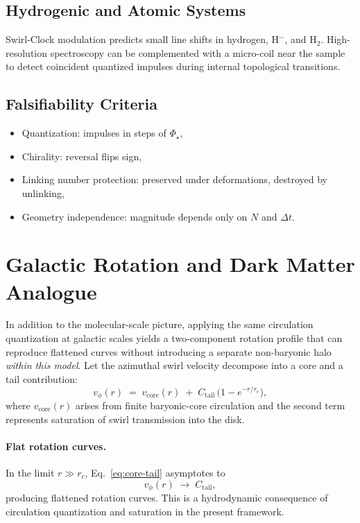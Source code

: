 \documentclass[11pt]{article}
\newcommand{\rc}{r_c}                                    %
\providecommand{\rc}{r_c}
\begin{document}
    \subsection{Hydrogenic and Atomic Systems}
    Swirl-Clock modulation predicts small line shifts in hydrogen, H$^-$, and H$_2$. High-resolution spectroscopy
    can be complemented with a micro-coil near the sample to detect coincident quantized impulses during
    internal topological transitions.

    \subsection{Falsifiability Criteria}
    \begin{itemize}
        \item Quantization: impulses in steps of $\Phi_\star$,
        \item Chirality: reversal flips sign,
        \item Linking number protection: preserved under deformations, destroyed by unlinking,
        \item Geometry independence: magnitude depends only on $N$ and $\Delta t$.
    \end{itemize}

\section{Galactic Rotation and Dark Matter Analogue}
\label{sec:galactic-dm}

    In addition to the molecular-scale picture, applying the same circulation quantization at galactic scales yields a two-component rotation profile that can reproduce flattened curves without introducing a separate non-baryonic halo \emph{within this model}.
    Let the azimuthal swirl velocity decompose into a core and a tail contribution:
    \begin{equation}
        v_\phi(r) \;=\; v_\text{core}(r) \;+\;
        C_\text{tail}\,\Big(1-e^{-r/\rc}\Big),
        \label{eq:core-tail}
    \end{equation}
    where $v_\text{core}(r)$ arises from finite baryonic-core circulation and the
    second term represents saturation of swirl transmission into the disk.

    \paragraph{Flat rotation curves.}
    In the limit $r\gg \rc$, Eq.~\eqref{eq:core-tail} asymptotes to
    \[
        v_\phi(r) \;\longrightarrow\; C_\text{tail},
    \]
    producing flattened rotation curves. This is a hydrodynamic consequence of circulation quantization and saturation in the present framework.
\end{document}
